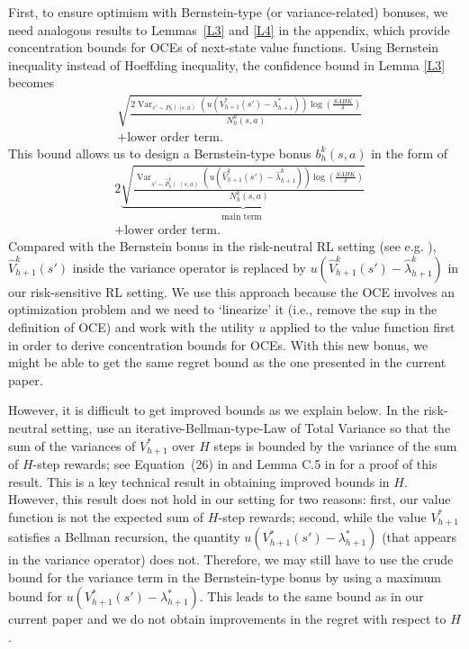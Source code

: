 \documentclass[11pt]{article}
\newcommand{\1}{\mathbbm{1}}
\begin{document}
First, to ensure optimism with Bernstein-type (or variance-related) bonuses, we need analogous results to Lemmas~\ref{L3} and \ref{L4} in the appendix, which provide concentration bounds for OCEs of next-state value functions. Using Bernstein inequality instead of Hoeffding inequality, the confidence bound in Lemma \ref{L3} becomes 
\begin{align*}
&\sqrt{\frac{2\operatorname{Var}_{s'\sim P_h(\cdot\vert s,a)}\left(u(V_{h+1}^*(s')-\lambda^*_{h+1})\right)\log\left(\frac{SAHK}{\delta}\right)}{N_h^k(s,a)}} \\
&+\text {lower order term}.
\end{align*}
This bound allows us to design a Bernstein-type bonus $b_h^k(s,a)$ in the form of 
\begin{align*}
&2 \underbrace{ \sqrt{\frac{\operatorname{Var}_{s' \sim \hat{P}_h^{k}\left(\cdot \mid s,a\right)}\left(u(\hat{V}_{h+1}^k(s')-\hat{\lambda}^k_{h+1})\right)\log\left(\frac{SAHK}{\delta}\right)}{N_h^k(s,a)}}}_{\text {main term }} \\
&+\text {lower order term}.
\end{align*}
Compared with the Bernstein bonus in the risk-neutral RL setting (see e.g. \citet{azar2017minimax}), $\hat{V}_{h+1}^k(s')$ inside the variance operator is replaced by $u(\hat{V}_{h+1}^k(s')-\hat{\lambda}^k_{h+1})$ in our risk-sensitive RL setting. We use this approach because the OCE involves an optimization problem and we need to `linearize' it (i.e., remove the sup in the definition of OCE) and work with the utility $u$ applied to the value function first in order to derive concentration bounds for OCEs.
With this new bonus, we might be able to get the same regret bound as the one presented in the current paper.

However, it is difficult to get improved bounds as we explain below. In the risk-neutral setting, \citet{azar2017minimax} 
use an iterative-Bellman-type-Law of Total Variance so that the sum of the variances of $V_{h+1}^*$ over $H$ steps is bounded by the variance of the sum of $H$-step rewards; see Equation~(26) in \citet{azar2017minimax} and Lemma C.5 in \citet{jin2018q} for a proof of this result. This is a key technical result in obtaining improved bounds in $H$. However, this result does not hold in our setting for two reasons: first, our value function is not the expected sum of $H$-step rewards; second, while the value $V_{h+1}^*$ satisfies a Bellman recursion, the quantity $u(V_{h+1}^*(s')-\lambda^*_{h+1})$ (that appears in the variance operator) does not. Therefore, we may still have to use the crude bound for the variance term in the Bernstein-type bonus by using a maximum bound for $u(V_{h+1}^*(s')-\lambda^*_{h+1})$. This leads to the same bound as in our current paper and we do not obtain improvements in the regret with respect to $H$.
\end{document}
